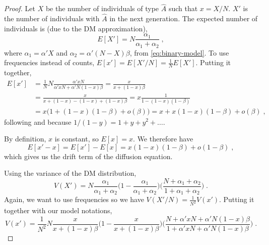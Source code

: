 \documentclass[12pt]{extarticle}
\begin{document}
\begin{appendices}
\begin{proof}
Let $X$ be the number of individuals of type $\hat{A}$ such that $x=X/N$. $X'$ is the number of individuals with $\hat{A}$ in the next generation.
The expected number of individuals is (due to the DM approximation),
\begin{equation}
E[X'] = N  \frac{\alpha_1}{\alpha_1+\alpha_2} \;,
\end{equation}
where $\alpha_1 = \alpha' X$ and $\alpha_2 = \alpha'(N-X)\beta$, from  \cref{eq:binary-model}.
To use frequencies instead of counts, $E[x'] = E[X'/N] = \frac{1}{N}E[X']$.
Putting it together,
\begin{equation}
\begin{split}
E[x'] &= \frac{1}{N}N\frac{\alpha' xN}{\alpha' xN + \alpha' N (1-x)\beta}
	  = \frac{x}{x + (1-x)\beta} \\
	  &= \frac{x}{x + (1-x) -(1-x) + (1-x)\beta}
	  = x \frac{1}{1 -(1-x)(1-\beta)}  \\
	  &= x \big(1 + (1-x)(1-\beta) + o(\beta)\big)
	  = x + x(1-x)(1-\beta) + o(\beta) \;,
\end{split}
\end{equation}
following \citet[p.~253, ch~7.2]{durret} and because $1/(1-y)=1+y+y^2+\ldots$.

By definition, $x$ is constant, so $E[x] = x$.
We therefore have
\begin{equation}\label{eq:expec_freq}
E[x'-x] = E[x'] - E[x] = x(1-x)(1-\beta) + o(1-\beta) \;,
\end{equation}
which gives us the drift term of the diffusion equation.

Using the variance of the DM distribution,
\begin{equation}
V(X') = N\frac{\alpha_1}{\alpha_1+\alpha_2}
\Big(1-\frac{\alpha_1}{\alpha_1+\alpha_2}\Big)
\Big(\frac{N + \alpha_1+\alpha_2}{1+\alpha_1+\alpha_2}\Big) \;.
\end{equation}
Again, we want to use frequencies so we have $V(X'/N) = \frac{1}{N^2}V(x')$.
Putting it together with our model notations,
\begin{equation}
V(x') = \frac{1}{N^2}N\frac{x}{x+(1-x)\beta}\Big(1-\frac{x}{x+(1-x)\beta}\Big)
\Big(\frac{N + \alpha' xN + \alpha' N(1-x)\beta}{1 + \alpha' xN + \alpha' N(1-x)\beta}\Big) \;.
\end{equation}


\end{proof}
\end{appendices}
\end{document}
